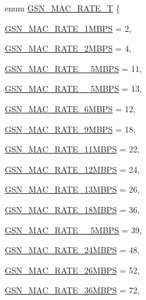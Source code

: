 \begin{DoxyCompactItemize}
\item 
enum \hyperlink{a00642_ga260da9755b2bec5e93c8b16a5a92d41d}{GSN\_\-MAC\_\-RATE\_\-T} \{ \par
\hyperlink{a00642_gga260da9755b2bec5e93c8b16a5a92d41da8eebea2599d06d1e26e773c8878ec37c}{GSN\_\-MAC\_\-RATE\_\-1MBPS} =  2, 
\par
\hyperlink{a00642_gga260da9755b2bec5e93c8b16a5a92d41daee17221504eae789861277320adb346a}{GSN\_\-MAC\_\-RATE\_\-2MBPS} =  4, 
\par
\hyperlink{a00642_gga260da9755b2bec5e93c8b16a5a92d41daa3c3416953cd6d2d272b9a41d47cec5c}{GSN\_\-MAC\_\-RATE\_\_\-5MBPS} =  11, 
\par
\hyperlink{a00642_gga260da9755b2bec5e93c8b16a5a92d41da6ffc66c1ba4d053f582de80f67147b53}{GSN\_\-MAC\_\-RATE\_\_\-5MBPS} =  13, 
\par
\hyperlink{a00642_gga260da9755b2bec5e93c8b16a5a92d41da4ee50fb4c98be33ef617386bea1cd128}{GSN\_\-MAC\_\-RATE\_\-6MBPS} =  12, 
\par
\hyperlink{a00642_gga260da9755b2bec5e93c8b16a5a92d41da0fd352dc70a6821572a0395e4240d991}{GSN\_\-MAC\_\-RATE\_\-9MBPS} =  18, 
\par
\hyperlink{a00642_gga260da9755b2bec5e93c8b16a5a92d41daeb680a41efe94b110c0a19c7134d5892}{GSN\_\-MAC\_\-RATE\_\-11MBPS} =  22, 
\par
\hyperlink{a00642_gga260da9755b2bec5e93c8b16a5a92d41da97cdd89b6922881aab4d80c151adaf2b}{GSN\_\-MAC\_\-RATE\_\-12MBPS} =  24, 
\par
\hyperlink{a00642_gga260da9755b2bec5e93c8b16a5a92d41da8982b7bfe30b509211ddb4bfaec9f6b2}{GSN\_\-MAC\_\-RATE\_\-13MBPS} =  26, 
\par
\hyperlink{a00642_gga260da9755b2bec5e93c8b16a5a92d41da1fa98727e873a12b52fe5654f9e8beb0}{GSN\_\-MAC\_\-RATE\_\-18MBPS} =  36, 
\par
\hyperlink{a00642_gga260da9755b2bec5e93c8b16a5a92d41dad5feaa4be91659303c8e8905590004e8}{GSN\_\-MAC\_\-RATE\_\_\-5MBPS} =  39, 
\par
\hyperlink{a00642_gga260da9755b2bec5e93c8b16a5a92d41dad28f25101ea2432bdd1a06fe2a97fc14}{GSN\_\-MAC\_\-RATE\_\-24MBPS} =  48, 
\par
\hyperlink{a00642_gga260da9755b2bec5e93c8b16a5a92d41dad012ef0af6775a233e4fefa0b163dd2c}{GSN\_\-MAC\_\-RATE\_\-26MBPS} =  52, 
\par
\hyperlink{a00642_gga260da9755b2bec5e93c8b16a5a92d41da5a4fdc5677b4912f81aa0367a93ac63b}{GSN\_\-MAC\_\-RATE\_\-36MBPS} =  72, 

\end{DoxyCompactItemize}
